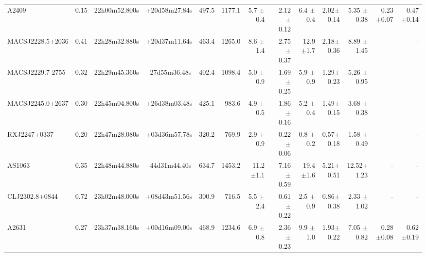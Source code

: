 \documentclass{aa}
\begin{document}
\begin{landscape}
\begin{longtable}{lcccrrrrrrrrr}
A2409 		  &0.15 & 22h00m52.800s & +20d58m27.84s &  497.5   &  1177.1  &  5.7  $\pm$0.4 & 2.12 $\pm$ 0.12&6.4  $\pm$0.4  & 2.02$\pm$0.14& 5.35 $\pm$0.38& 0.23 $\pm$0.07 & 0.47 $\pm$0.14  \\
MACSJ2228.5+2036 &0.41 & 22h28m32.880s & +20d37m11.64s &  463.4   &  1265.0  &  8.6  $\pm$1.4 & 2.75 $\pm$ 0.37&12.9 $\pm$1.7  & 2.18$\pm$0.36& 8.89 $\pm$1.45& - & -   \\
MACSJ2229.7-2755 &0.32 & 22h29m45.360s & --27d55m36.48s &  402.4   &  1098.4  &  5.0  $\pm$0.9 & 1.69 $\pm$ 0.25&5.9  $\pm$0.9  & 1.29$\pm$0.23& 5.26 $\pm$0.95& - & -   \\
MACSJ2245.0+2637 &0.30 & 22h45m04.800s & +26d38m03.48s &  425.1   &  983.6   &  4.9  $\pm$0.5 & 1.86 $\pm$ 0.16&5.2  $\pm$0.4  & 1.49$\pm$0.15& 3.68 $\pm$0.38& - & -   \\
RXJ2247+0337	 &0.20 & 22h47m28.080s & +03d36m57.78s &  320.2   &  769.9   &  2.9  $\pm$0.9 & 0.22 $\pm$ 0.06&0.8  $\pm$0.2  & 0.57$\pm$0.18& 1.58 $\pm$0.49& - & -   \\
AS1063 	 &0.35 & 22h48m44.880s &--44d31m44.40s &  634.7   &  1453.2  &  11.2 $\pm$1.1 & 7.16 $\pm$ 0.59&19.4 $\pm$1.6  & 5.21$\pm$0.51& 12.52$\pm$1.23& - & -   \\
CLJ2302.8+0844 &0.72 & 23h02m48.000s & +08d43m51.56s &  300.9   &  716.5   &  5.5  $\pm$2.4 & 0.61 $\pm$ 0.22&2.5  $\pm$0.9  & 0.86$\pm$0.38& 2.33 $\pm$1.02& - & -   \\
A2631 		 &0.27 & 23h37m38.160s & +00d16m09.00s &  468.9   &  1234.6  &  6.9  $\pm$0.8 & 2.36 $\pm$ 0.23&9.9  $\pm$1.0  & 1.93$\pm$0.22& 7.05 $\pm$0.82& 0.28 $\pm$0.08 & 0.62 $\pm$0.19 \\    
\end{longtable}       
\end{landscape}       
\end{document}

